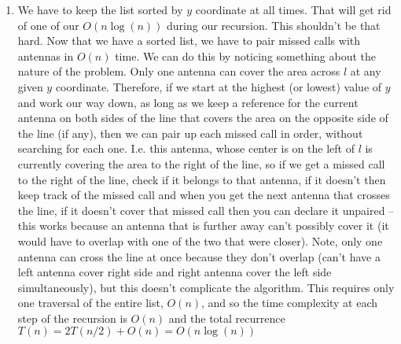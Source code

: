 \documentclass[11pt]{article}
\begin{document}
\begin{enumerate}
\begin{enumerate}
\item We have to keep the list sorted by $y$ coordinate at all times. That will get rid of one of our $O(n\log(n))$ during our recursion. This shouldn't be that hard. Now that we have a sorted list, we have to pair missed calls with antennas in $O(n)$ time. We can do this by noticing something about the nature of the problem. Only one antenna can cover the area across $l$ at any given $y$ coordinate. Therefore, if we start at the highest (or lowest) value of $y$ and work our way down, as long as we keep a reference for the current antenna on both sides of the line that covers the area on the opposite side of the line (if any), then we can pair up each missed call in order, without searching for each one. I.e. this antenna, whose center is on the left of $l$ is currently covering the area to the right of the line, so if we get a missed call to the right of the line, check if it belongs to that antenna, if it doesn't then keep track of the missed call and when you get the next antenna that crosses the line, if it doesn't cover that missed call then you can declare it unpaired -- this works because an antenna that is further away can't possibly cover it (it would have to overlap with one of the two that were closer). Note, only one antenna can cross the line at once because they don't overlap (can't have a left antenna cover right side and right antenna cover the left side simultaneously), but this doesn't complicate the algorithm. This requires only one traversal of the entire list, $O(n)$, and so the time complexity at each step of the recursion is $O(n)$ and the total recurrence $T(n)=2T(n/2)+O(n)=O(n\log(n))$
\end{enumerate}
\end{enumerate}
\end{document}
